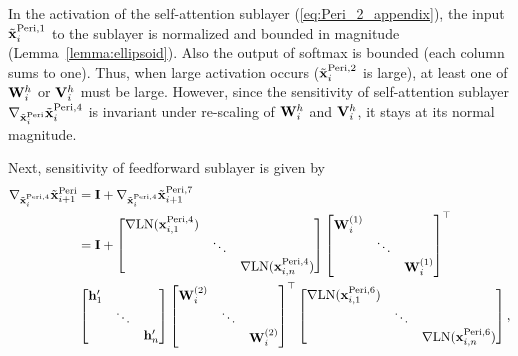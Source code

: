 \documentclass[journal]{IEEEtran}
\newcommand{\bfI}{{\bf I}}
\newcommand{\bfV}{{\bf V}}
\newcommand{\bfW}{{\bf W}}
\newcommand{\bfh}{{\bf h}}
\newcommand{\bfx}{{\bf x}}
\theoremstyle{plain}
\theoremstyle{definition}
\theoremstyle{remark}
\begin{document}
In the activation of the self-attention sublayer (\ref{eq:Peri_2_appendix}), the input $\tilde{\bfx}^{\rm Peri, 1}_i$ to the sublayer is normalized and bounded in magnitude (Lemma~\ref{lemma:ellipsoid}). Also the output of softmax is bounded (each column sums to one). Thus, when large activation occurs ($\tilde{\bfx}^{\rm Peri, 2}_i$ is large), at least one of $\bfW_{i}^{h}$ or $\bfV_{i}^{h}$ must be large. However, since the sensitivity of self-attention sublayer $\nabla_{\tilde{\bfx}_i^{{\rm Peri}}} \tilde{\bfx}_i^{{\rm Peri}, 4}$ is invariant under re-scaling of $\bfW_{i}^{h}$ and $\bfV_{i}^{h}$, it stays at its normal magnitude.

Next, sensitivity of feedforward sublayer is given by
\begin{align}
   \nabla_{\tilde{\bfx}_i^{{\rm Peri}, 4}} \tilde{\bfx}_{i+1}^{{\rm Peri}} &= \bfI + \nabla_{\tilde{\bfx}_i^{{\rm Peri}, 4}} \tilde{\bfx}_{i+1}^{{\rm Peri, 7}} \\
   &= \bfI 
   +  \begin{bmatrix}
\nabla {\rm LN}(\bfx^{{\rm Peri}, 4}_{i, 1}) &        &        \\
                 & \ddots &        \\
                 &        & \nabla {\rm LN}(\bfx^{{\rm Peri}, 4}_{i, n})
\end{bmatrix} 
\begin{bmatrix}
\bfW_{i}^{(1)} &        &        \\
                 & \ddots &        \\
                 &        & \bfW_{i}^{(1)}
\end{bmatrix}^\top \\
   & \begin{bmatrix}
\bfh'_1 &        &        \\
                 & \ddots &        \\
                 &        & \bfh'_n
\end{bmatrix}
\begin{bmatrix}
\bfW_{i}^{(2)} &        &        \\
                 & \ddots &        \\
                 &        & \bfW_{i}^{(2)}
\end{bmatrix}^\top \begin{bmatrix}
\nabla {\rm LN}(\bfx^{{\rm Peri}, 6}_{i, 1}) &        &        \\
                 & \ddots &        \\
                 &        & \nabla {\rm LN}(\bfx^{{\rm Peri}, 6}_{i, n})
\end{bmatrix},
\end{align}
\end{document}
